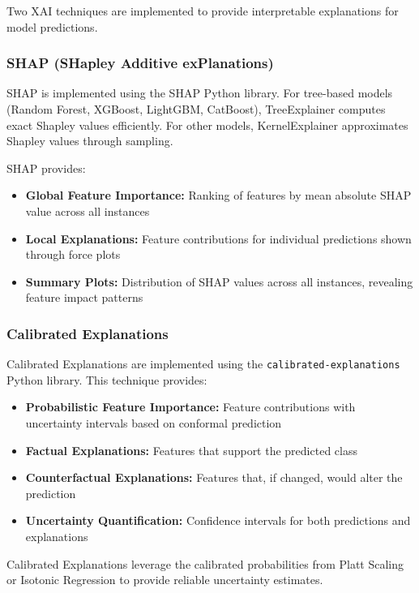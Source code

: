 Two XAI techniques are implemented to provide interpretable explanations for model predictions.

\subsubsection{SHAP (SHapley Additive exPlanations)}

SHAP is implemented using the SHAP Python library. For tree-based models (Random Forest, XGBoost, LightGBM, CatBoost), TreeExplainer computes exact Shapley values efficiently. For other models, KernelExplainer approximates Shapley values through sampling.

SHAP provides:
\begin{itemize}
    \item \textbf{Global Feature Importance:} Ranking of features by mean absolute SHAP value across all instances
    \item \textbf{Local Explanations:} Feature contributions for individual predictions shown through force plots
    \item \textbf{Summary Plots:} Distribution of SHAP values across all instances, revealing feature impact patterns
\end{itemize}

\subsubsection{Calibrated Explanations}

Calibrated Explanations are implemented using the \texttt{calibrated-explanations} Python library. This technique provides:

\begin{itemize}
    \item \textbf{Probabilistic Feature Importance:} Feature contributions with uncertainty intervals based on conformal prediction
    \item \textbf{Factual Explanations:} Features that support the predicted class
    \item \textbf{Counterfactual Explanations:} Features that, if changed, would alter the prediction
    \item \textbf{Uncertainty Quantification:} Confidence intervals for both predictions and explanations
\end{itemize}

Calibrated Explanations leverage the calibrated probabilities from Platt Scaling or Isotonic Regression to provide reliable uncertainty estimates.

